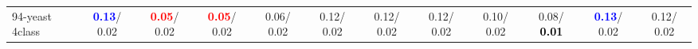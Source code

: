 \begin{table}[h]
\begin{center}
{\begin{tabular}{lc|c|c|c|c|c|c|c|c|c|c}
94-yeast 4class & \textcolor{blue}{\textbf{  0.13}}/  0.02 & \textcolor{red}{\textbf{  0.05}}/  0.02 & \textcolor{red}{\textbf{  0.05}}/  0.02 &   0.06/  0.02 &   0.12/  0.02 &   0.12/  0.02 &   0.12/  0.02 &   0.10/  0.02 &   0.08/\textcolor{black}{\textbf{  0.01}} & \textcolor{blue}{\textbf{  0.13}}/  0.02 &   0.12/  0.02 \\\end{tabular}
}\label{strats2bCIELM}
\end{center}
\end{table}
                                     
